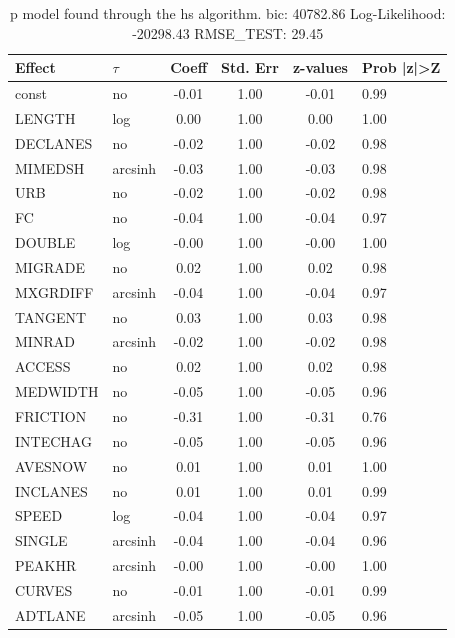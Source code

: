 \begin{table}
	\caption{p model found through the hs algorithm. bic: 40782.86 Log-Likelihood: -20298.43 RMSE_TEST: 29.45}
	\begin{center}
		\begin{tabular}{|l|l|c|c|c|l|}
			\hline
			Effect & $\tau$ & Coeff & Std. Err & z-values & Prob |z|>Z \\
			\hline
			const & no & -0.01 & 1.00 & -0.01 & 0.99 \\
			\hline
			LENGTH & log & 0.00 & 1.00 & 0.00 & 1.00 \\
			\hline
			DECLANES & no & -0.02 & 1.00 & -0.02 & 0.98 \\
			\hline
			MIMEDSH & arcsinh & -0.03 & 1.00 & -0.03 & 0.98 \\
			\hline
			URB & no & -0.02 & 1.00 & -0.02 & 0.98 \\
			\hline
			FC & no & -0.04 & 1.00 & -0.04 & 0.97 \\
			\hline
			DOUBLE & log & -0.00 & 1.00 & -0.00 & 1.00 \\
			\hline
			MIGRADE & no & 0.02 & 1.00 & 0.02 & 0.98 \\
			\hline
			MXGRDIFF & arcsinh & -0.04 & 1.00 & -0.04 & 0.97 \\
			\hline
			TANGENT & no & 0.03 & 1.00 & 0.03 & 0.98 \\
			\hline
			MINRAD & arcsinh & -0.02 & 1.00 & -0.02 & 0.98 \\
			\hline
			ACCESS & no & 0.02 & 1.00 & 0.02 & 0.98 \\
			\hline
			MEDWIDTH & no & -0.05 & 1.00 & -0.05 & 0.96 \\
			\hline
			FRICTION & no & -0.31 & 1.00 & -0.31 & 0.76 \\
			\hline
			INTECHAG & no & -0.05 & 1.00 & -0.05 & 0.96 \\
			\hline
			AVESNOW & no & 0.01 & 1.00 & 0.01 & 1.00 \\
			\hline
			INCLANES & no & 0.01 & 1.00 & 0.01 & 0.99 \\
			\hline
			SPEED & log & -0.04 & 1.00 & -0.04 & 0.97 \\
			\hline
			SINGLE & arcsinh & -0.04 & 1.00 & -0.04 & 0.96 \\
			\hline
			PEAKHR & arcsinh & -0.00 & 1.00 & -0.00 & 1.00 \\
			\hline
			CURVES & no & -0.01 & 1.00 & -0.01 & 0.99 \\
			\hline
			ADTLANE & arcsinh & -0.05 & 1.00 & -0.05 & 0.96 \\
			\hline

\end{tabular}
\end{center}
\end{table}
